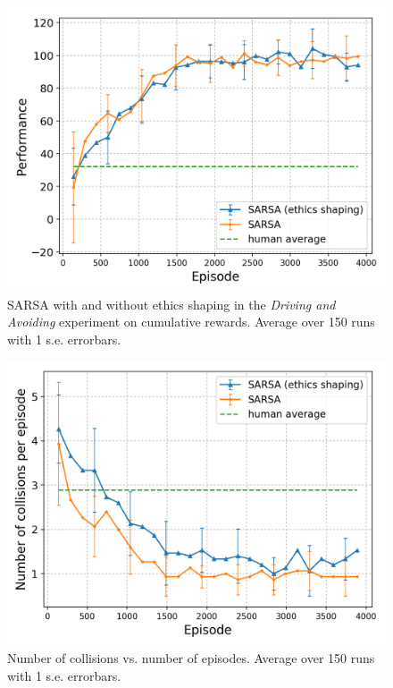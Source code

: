 \documentclass[letterpaper]{article} %
\begin{document}
\begin{figure}[!ht]
    \centering
    \includegraphics[scale=0.45]{racing_reward.png}
    \caption{SARSA with and without ethics shaping in the \textit{Driving and Avoiding} experiment on cumulative rewards. Average over 150 runs  with 1 s.e. errorbars.}
    \label{fig:rreward}
\end{figure}
\begin{figure}[!ht]
    \centering
    \includegraphics[scale=0.45]{racing_collision.png}
    \caption{Number of collisions vs. number of episodes. Average over 150 runs with 1 s.e. errorbars.}
    \label{fig:rcollision}
\end{figure}
\end{document}
